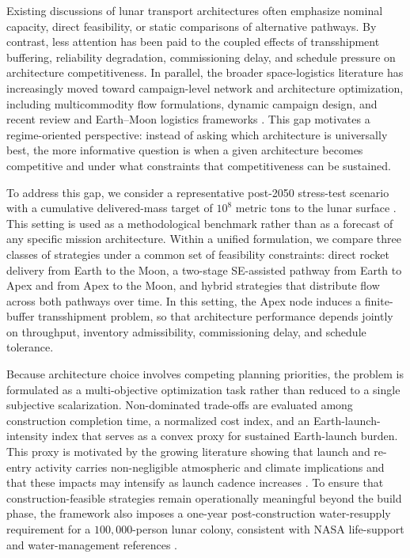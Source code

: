 \documentclass[12pt]{article}
\begin{document}
	Existing discussions of lunar transport architectures often emphasize nominal capacity, direct feasibility, or static comparisons of alternative pathways. By contrast, less attention has been paid to the coupled effects of transshipment buffering, reliability degradation, commissioning delay, and schedule pressure on architecture competitiveness. In parallel, the broader space-logistics literature has increasingly moved toward campaign-level network and architecture optimization, including multicommodity flow formulations, dynamic campaign design, and recent review and Earth--Moon logistics frameworks \cite{Ishimatsu2016EMMLogistics,Ho2016FlexiblePath,Ho2024Review,Apa2025EarthMoonLogistics}. This gap motivates a regime-oriented perspective: instead of asking which architecture is universally best, the more informative question is when a given architecture becomes competitive and under what constraints that competitiveness can be sustained.
	
	To address this gap, we consider a representative post-2050 stress-test scenario with a cumulative delivered-mass target of $10^8$ metric tons to the lunar surface \cite{COMAP2026B}. This setting is used as a methodological benchmark rather than as a forecast of any specific mission architecture. Within a unified formulation, we compare three classes of strategies under a common set of feasibility constraints: direct rocket delivery from Earth to the Moon, a two-stage SE-assisted pathway from Earth to Apex and from Apex to the Moon, and hybrid strategies that distribute flow across both pathways over time. In this setting, the Apex node induces a finite-buffer transshipment problem, so that architecture performance depends jointly on throughput, inventory admissibility, commissioning delay, and schedule tolerance.
	
	Because architecture choice involves competing planning priorities, the problem is formulated as a multi-objective optimization task rather than reduced to a single subjective scalarization. Non-dominated trade-offs are evaluated among construction completion time, a normalized cost index, and an Earth-launch-intensity index that serves as a convex proxy for sustained Earth-launch burden. This proxy is motivated by the growing literature showing that launch and re-entry activity carries non-negligible atmospheric and climate implications and that these impacts may intensify as launch cadence increases \cite{Ryan2022,Brown2023SustainableLaunch,Sirieys2022AtmosphericImpact,Barker2024Inventory,Sharma2024Atmosphere,Revell2025Ozone}. To ensure that construction-feasible strategies remain operationally meaningful beyond the build phase, the framework also imposes a one-year post-construction water-resupply requirement for a $100{,}000$-person lunar colony, consistent with NASA life-support and water-management references \cite{Ewert2022BVAD,NASA2023WaterHumanConsumptionTB,NASA2023ECLSSBrief,Williamson2023ISSWater,NASASTD3001V2RevE2025}.
	
\end{document}
